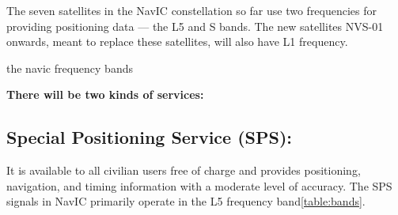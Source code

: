 




%


		The seven satellites in the NavIC constellation so far use two frequencies for providing positioning data — the L5 and S bands. The new satellites NVS-01 onwards, meant to replace these satellites, will also have L1 frequency.
	
		
	\begin{table}[h!]
	\small
	\centering
	\caption{the navic frequency bands}
	\label{table:bands}
	
	\end{table}

\textbf{There will be two kinds of services:}
		

\subsection{Special Positioning Service (SPS):}
	It is available to all civilian users free of charge and provides positioning, navigation, and timing information with a moderate level of accuracy. The SPS signals in NavIC primarily operate in the L5 frequency band\ref{table:bands}.
